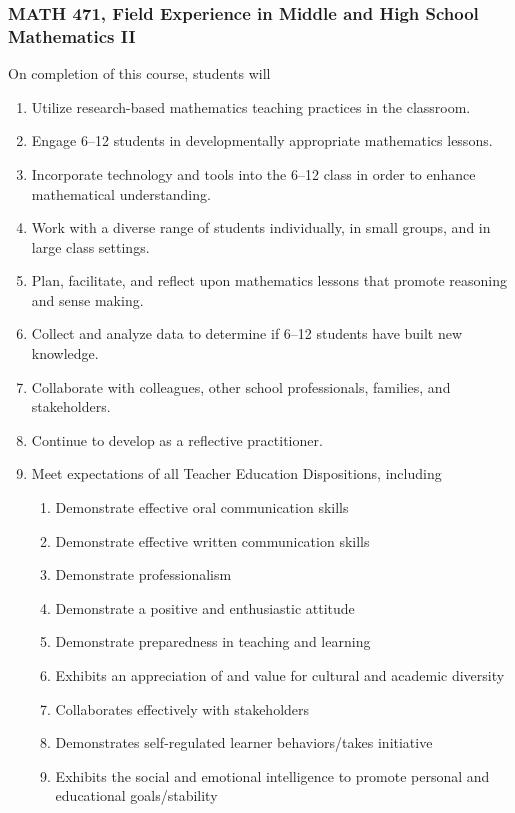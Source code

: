 \documentclass[11pt]{article}
\newenvironment{alphalist}{
\begin{enumerate}[label=(\arabic*),widest=107 ,leftmargin=25pt, itemsep=0pt]}
{\end{enumerate}}
\newenvironment{betalist}{
\begin{enumerate}[label=(\alph*),widest=zzz,leftmargin=25pt,itemsep=0pt]}
{\end{enumerate}}
\begin{document}
\subsubsection{MATH 471, Field Experience in Middle and High School Mathematics II}

On completion of this course, students will
\begin{alphalist}
\item Utilize research-based mathematics teaching practices in the classroom.
\item Engage 6--12 students in developmentally appropriate mathematics lessons.
\item Incorporate technology and tools into the 6--12 class in order to enhance mathematical understanding.
\item Work with a diverse range of students individually, in small groups, and in large class settings.
\item Plan, facilitate, and reflect upon mathematics lessons that promote reasoning and sense making.
\item Collect and analyze data to determine if 6--12 students have built new knowledge. 
\item Collaborate with colleagues, other school professionals, families, and stakeholders.
\item Continue to develop as a reflective practitioner.
\item Meet expectations of all Teacher Education Dispositions, including
\begin{betalist}
\item Demonstrate effective oral communication skills
\item Demonstrate effective written communication skills
\item Demonstrate professionalism
\item Demonstrate a positive and enthusiastic attitude
\item Demonstrate preparedness in teaching and learning
\item Exhibits an appreciation of and value for cultural and academic diversity
\item Collaborates effectively with stakeholders
\item Demonstrates self-regulated learner behaviors/takes initiative
\item Exhibits the social and emotional intelligence to promote personal and educational goals/stability
\end{betalist}
\end{alphalist}
\end{document}
